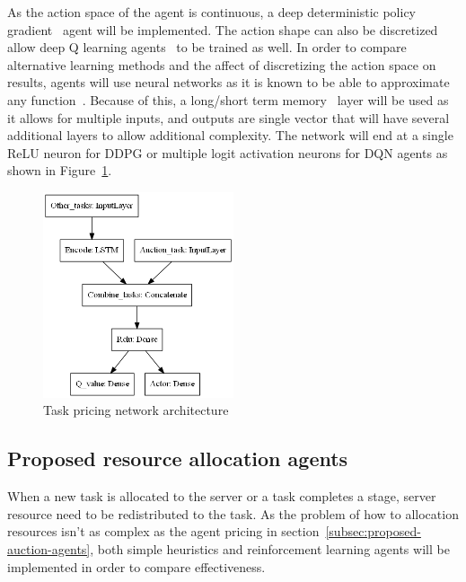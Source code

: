 As the action space of the agent is continuous, a deep deterministic policy gradient~\citep{ddpg} agent
will be implemented. The action shape can also be discretized allow deep Q learning agents~\cite{atari} to be trained
as well. In order to compare alternative learning methods and the affect of discretizing the action space on results,
agents will use neural networks as it is known to be able to approximate any
function~\citep{csaji2001approximation}. Because of this, a long/short term memory~\citep{LSTM} layer will be used as
it allows for multiple inputs, and outputs are single vector that will have several additional layers to allow
additional complexity. The network will end at a single ReLU neuron for DDPG or multiple logit activation neurons for
DQN agents as shown in Figure~\ref{fig:task_pricing_network_architecture}.

\begin{figure}
    \centering
    \includegraphics[width=0.5\textwidth]{figures/solution_fig/task_pricing_network_architecture.png}
    \caption{Task pricing network architecture}
    \label{fig:task_pricing_network_architecture}
\end{figure}

\subsection{Proposed resource allocation agents}\label{subsec:proposed-resource-allocation-agents}
When a new task is allocated to the server or a task completes a stage, server resource need to be redistributed
to the task. As the problem of how to allocation resources isn't as complex as the agent pricing in
section~\ref{subsec:proposed-auction-agents}, both simple heuristics and reinforcement learning agents will be
implemented in order to compare effectiveness.

